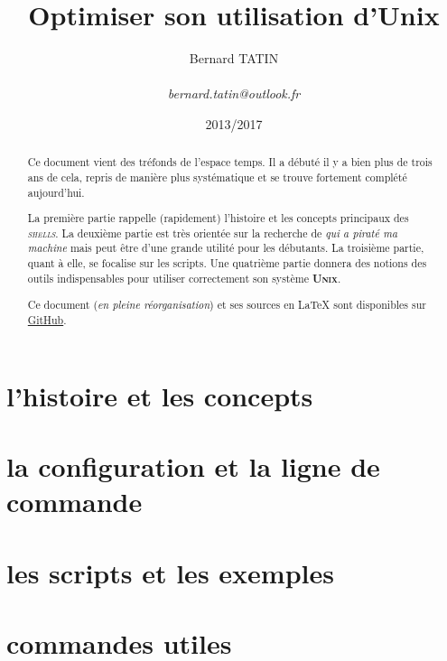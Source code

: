 \documentclass[psamsfonts, 12pt]{amsproc} %
\title{Optimiser son utilisation d'Unix}
\author{Bernard TATIN \\
\small \\
\textit{bernard.tatin@outlook.fr}}
\date{2013/2017} %
\makeatletter
\newcommand\osname[1]{\textsc{\textbf{#1}}\index{#1@\textsc{#1}}\xspace}
\newcommand\unix{\osname{Unix}}
\newcommand\shells{\emph{\textsc{shells}}\xspace{}}
\makeatother
\begin{document}
 \begin{abstract}
 Ce document vient des tréfonds de l'espace temps. Il a débuté il y a bien plus de trois ans de cela, repris de manière plus systématique et se trouve fortement complété aujourd'hui.

 La première partie rappelle (rapidement) l'histoire et les concepts principaux des \shells{}.
 La deuxième partie est très orientée sur la recherche de \emph{qui a piraté ma machine} mais peut être
 d'une grande utilité pour les débutants. La troisième partie, quant à elle, se focalise sur les scripts.
 Une quatrième partie donnera des notions des outils indispensables pour utiliser correctement son système \unix{}.

 Ce document (\emph{en pleine réorganisation}) et ses sources en \LaTeX{} sont disponibles sur \href{https://github.com/BernardTatin/optimize-unix}{GitHub}.
 \end{abstract}
\maketitle


\tableofcontents

\part{l'histoire et les concepts}


\part{la configuration et la ligne de commande}


\part{les scripts et les exemples}


\part{commandes utiles}



\printindex
\end{document}
